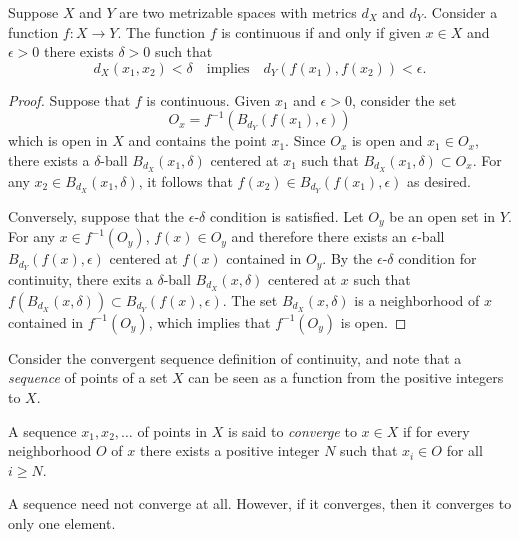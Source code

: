 \begin{theorem}
Suppose $X$ and $Y$ are two metrizable spaces with metrics $d_X$ and $d_Y$.
Consider a function $f : X \rightarrow Y$.
The function $f$ is continuous if and only if given $x \in X$ and $\epsilon > 0$ there exists $\delta > 0$ such that
\begin{equation*}
d_X(x_1, x_2) < \delta
\quad \text{implies} \quad
d_Y \left( f(x_1), f(x_2) \right) < \epsilon.
\end{equation*}
\end{theorem}
\begin{proof}
Suppose that $f$ is continuous.
Given $x_1$ and $\epsilon > 0$, consider the set
\begin{equation*}
O_x = f^{-1} \left( B_{d_Y} (f(x_1), \epsilon) \right)
\end{equation*}
which is open in $X$ and contains the point $x_1$.
Since $O_x$ is open and $x_1 \in O_x$, there exists a $\delta$-ball $B_{d_X} (x_1, \delta)$ centered at $x_1$ such that $B_{d_X} (x_1, \delta) \subset O_x$.
For any $x_2 \in B_{d_X} (x_1, \delta)$, it follows that $f(x_2) \in B_{d_Y} (f(x_1), \epsilon)$ as desired.

Conversely, suppose that the $\epsilon$-$\delta$ condition is satisfied.
Let $O_y$ be an open set in $Y$.
For any $x \in f^{-1} (O_y)$, $f(x) \in O_y$ and therefore there exists an $\epsilon$-ball $B_{d_Y} (f(x), \epsilon)$ centered at $f(x)$ contained in $O_y$.
By the $\epsilon$-$\delta$ condition for continuity, there exits a $\delta$-ball $B_{d_X} (x, \delta)$ centered at $x$ such that $f \left( B_{d_X} (x,\delta) \right) \subset B_{d_Y} \left( f(x), \epsilon \right)$.
The set $B_{d_X} (x, \delta)$ is a neighborhood of $x$ contained in $f^{-1} (O_y)$, which implies that $f^{-1} (O_y)$ is open.
\end{proof}

Consider the convergent sequence definition of continuity, and note that a \emph{sequence} of points of a set $X$ can be seen as a function from the positive integers to $X$.

\begin{definition} \label{definition:SequenceConvergence}
A sequence $x_1, x_2, \ldots$ of points in $X$ is said to \emph{converge} to $x \in X$ if for every neighborhood $O$ of $x$ there exists a positive integer $N$ such that $x_i \in O$ for all $i \geq N$.
\end{definition}

A sequence need not converge at all.
However, if it converges, then it converges to only one element.

